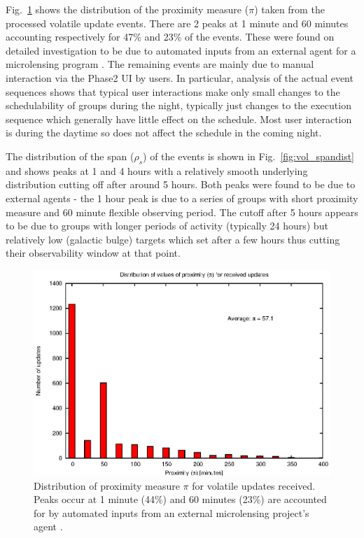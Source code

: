 
Fig.~\ref{fig:vol_pidist} shows the distribution of the proximity measure ($\pi$) taken from the processed volatile update events. There are 2 peaks at 1 minute and 60 minutes accounting respectively for 47\% and 23\% of the events. These were found on detailed investigation to be due to automated inputs from an external agent for a microlensing program \citep{tsapras09robonet}. The remaining events are mainly due to manual interaction via the Phase2 UI by users. In particular, analysis of the actual event sequences shows that typical user interactions make only small changes to the schedulability of groups during the night, typically just changes to the execution sequence which generally have little effect on the schedule. Most user interaction is during the daytime so does not affect the schedule in the coming night. 

The distribution of the span ($\rho_s$) of the events is shown in Fig.~\ref{fig:vol_spandist} and shows peaks at 1 and 4 hours with a relatively smooth underlying distribution cutting off after around 5 hours. Both peaks were found to be due to external agents - the 1 hour peak is due to a series of groups with short proximity measure and 60 minute flexible observing  period. The cutoff after 5 hours appears to be due to groups with longer periods of activity (typically 24 hours) but relatively low (galactic bulge) targets which set after a few hours thus cutting their observability window at that point.


\begin{figure}[htbp]
\begin{center}
    \includegraphics[scale=1.0, angle=0]{figures/vol_pi.eps}
\caption[Distribution of proximity measure $\pi$ for volatile updates received.]
{Distribution of proximity measure $\pi$ for volatile updates received. Peaks occur at 1 minute (44\%) and 60 minutes (23\%) are accounted for by automated inputs from an external microlensing project's agent \citep{tsapras09robonet}.}
\label{fig:vol_pidist}
\end{center}
\end{figure}

